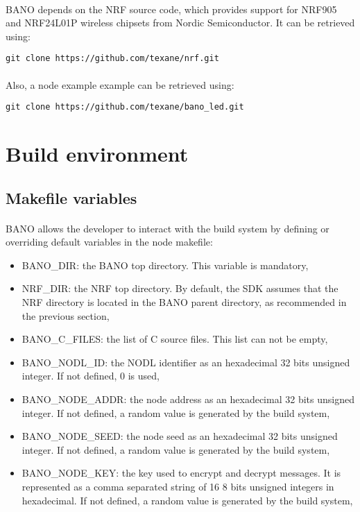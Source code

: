 \documentclass[a4paper, 11pt]{article}
\begin{document}
\paragraph{}
BANO depends on the NRF source code, which provides support for
NRF905 and NRF24L01P wireless chipsets from Nordic Semiconductor.
It can be retrieved using:
\begin{scriptsize}
\begin{verbatim}
git clone https://github.com/texane/nrf.git
\end{verbatim}
\end{scriptsize}

\paragraph{}
Also, a node example example can be retrieved using:
\begin{scriptsize}
\begin{verbatim}
git clone https://github.com/texane/bano_led.git
\end{verbatim}
\end{scriptsize}

\clearpage
\section{Build environment}

\subsection{Makefile variables}
\paragraph{}
BANO allows the developer to interact with the build system by
defining or overriding default variables in the node makefile:
\begin{itemize}
\item BANO\_DIR: the BANO top directory. This variable is
mandatory,
\item NRF\_DIR: the NRF top directory. By default, the SDK
assumes that the NRF directory is located in the BANO parent
directory, as recommended in the previous section,
\item BANO\_C\_FILES: the list of C source files. This list
can not be empty,
\item BANO\_NODL\_ID: the NODL identifier as an hexadecimal
32 bits unsigned integer. If not defined, 0 is used,
\item BANO\_NODE\_ADDR: the node address as an hexadecimal 32
bits unsigned integer. If not defined, a random value is
generated by the build system,
\item BANO\_NODE\_SEED: the node seed as an hexadecimal 32
bits unsigned integer. If not defined, a random value is
generated by the build system,
\item BANO\_NODE\_KEY: the key used to encrypt and decrypt
messages. It is represented as a comma separated string of 16
8 bits unsigned integers in hexadecimal. If not defined, a
random value is generated by the build system,
\end{itemize}
\end{document}
